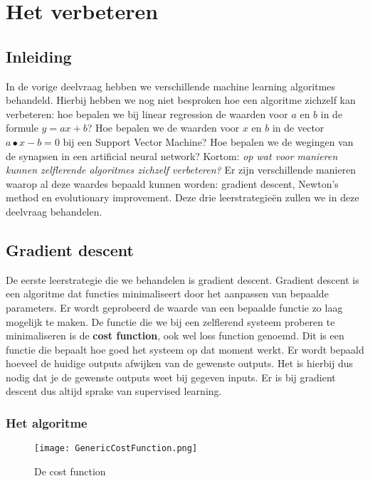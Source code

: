 \section{Het verbeteren}
\label{chapter:Improvement}

\subsection{Inleiding}
In de vorige deelvraag hebben we verschillende machine learning algoritmes behandeld. Hierbij hebben we nog niet besproken hoe een algoritme zichzelf kan verbeteren: hoe bepalen we bij linear regression de waarden voor $a$ en $b$ in de formule $ y = ax + b $? Hoe bepalen we de waarden voor  $x$ en $b$ in de vector $ a ∙ x - b = 0 $ bij een Support Vector Machine? Hoe bepalen we de wegingen van de synapsen in een artificial neural network? Kortom: \textit{op wat voor manieren kunnen zelflerende algoritmes zichzelf verbeteren?} Er zijn verschillende manieren waarop al deze waardes bepaald kunnen worden: gradient descent, Newton's method en evolutionary improvement. Deze drie leerstrategie\"en zullen we in deze deelvraag behandelen.

\subsection{Gradient descent}
\label{fig:GradientDescent}
De eerste leerstrategie die we behandelen is gradient descent. Gradient descent is een algoritme dat functies minimaliseert door het aanpassen van bepaalde parameters. Er wordt geprobeerd de waarde van een bepaalde functie zo laag mogelijk te maken. De functie die we bij een zelflerend systeem proberen te minimaliseren is de \textbf{cost function}, ook wel loss function genoemd. Dit is een functie die bepaalt hoe goed het systeem op dat moment werkt. Er wordt bepaald hoeveel de huidige outputs afwijken van de gewenste outputs. Het is hierbij dus nodig dat je de gewenste outputs weet bij gegeven inputs. Er is bij gradient descent dus altijd sprake van supervised learning. 

\subsubsection{Het algoritme} 
\begin{figure}[H]
  \centering
    \texttt{[image: GenericCostFunction.png]}
  \caption{De cost function}
  \label{fig:GenericCostFunction}
\end{figure}

